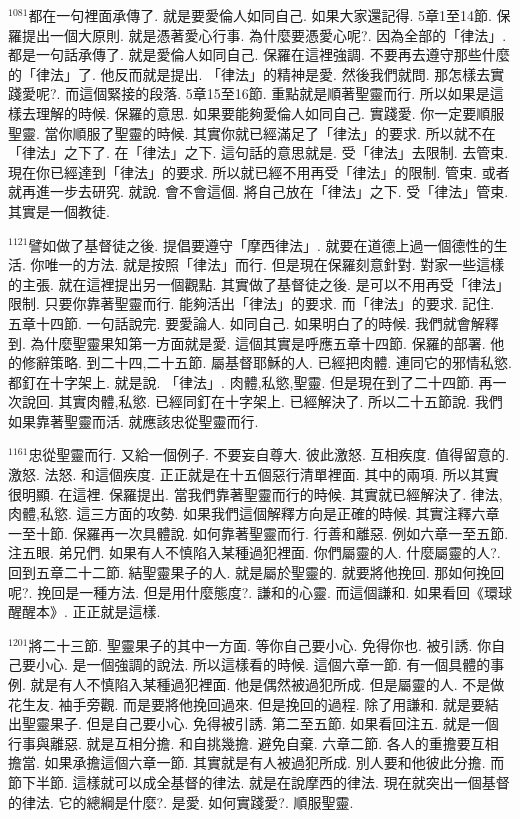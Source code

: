 \documentclass{book}
\begin{document}
$^{1081}$都在一句裡面承傳了.
就是要愛倫人如同自己.
如果大家還記得.
5章1至14節.
保羅提出一個大原則.
就是憑著愛心行事.
為什麼要憑愛心呢?.
因為全部的「律法」.
都是一句話承傳了.
就是愛倫人如同自己.
保羅在這裡強調.
不要再去遵守那些什麼的「律法」了.
他反而就是提出.
「律法」的精神是愛.
然後我們就問.
那怎樣去實踐愛呢?.
而這個緊接的段落.
5章15至16節.
重點就是順著聖靈而行.
所以如果是這樣去理解的時候.
保羅的意思.
如果要能夠愛倫人如同自己.
實踐愛.
你一定要順服聖靈.
當你順服了聖靈的時候.
其實你就已經滿足了「律法」的要求.
所以就不在「律法」之下了.
在「律法」之下.
這句話的意思就是.
受「律法」去限制.
去管束.
現在你已經達到「律法」的要求.
所以就已經不用再受「律法」的限制.
管束.
或者就再進一步去研究.
就說.
會不會這個.
將自己放在「律法」之下.
受「律法」管束.
其實是一個教徒.

$^{1121}$譬如做了基督徒之後.
提倡要遵守「摩西律法」.
就要在道德上過一個德性的生活.
你唯一的方法.
就是按照「律法」而行.
但是現在保羅刻意針對.
對家一些這樣的主張.
就在這裡提出另一個觀點.
其實做了基督徒之後.
是可以不用再受「律法」限制.
只要你靠著聖靈而行.
能夠活出「律法」的要求.
而「律法」的要求.
記住.
五章十四節.
一句話說完.
要愛論人.
如同自己.
如果明白了的時候.
我們就會解釋到.
為什麼聖靈果知第一方面就是愛.
這個其實是呼應五章十四節.
保羅的部署.
他的修辭策略.
到二十四,二十五節.
屬基督耶穌的人.
已經把肉體.
連同它的邪情私慾.
都釘在十字架上.
就是說.
「律法」.
肉體,私慾,聖靈.
但是現在到了二十四節.
再一次說回.
其實肉體,私慾.
已經同釘在十字架上.
已經解決了.
所以二十五節說.
我們如果靠著聖靈而活.
就應該忠從聖靈而行.

$^{1161}$忠從聖靈而行.
又給一個例子.
不要妄自尊大.
彼此激怒.
互相疾度.
值得留意的.
激怒.
法怒.
和這個疾度.
正正就是在十五個惡行清單裡面.
其中的兩項.
所以其實很明顯.
在這裡.
保羅提出.
當我們靠著聖靈而行的時候.
其實就已經解決了.
律法,肉體,私慾.
這三方面的攻勢.
如果我們這個解釋方向是正確的時候.
其實注釋六章一至十節.
保羅再一次具體說.
如何靠著聖靈而行.
行善和離惡.
例如六章一至五節.
注五眼.
弟兄們.
如果有人不慎陷入某種過犯裡面.
你們屬靈的人.
什麼屬靈的人?.
回到五章二十二節.
結聖靈果子的人.
就是屬於聖靈的.
就要將他挽回.
那如何挽回呢?.
挽回是一種方法.
但是用什麼態度?.
謙和的心靈.
而這個謙和.
如果看回《環球醒醒本》.
正正就是這樣.

$^{1201}$將二十三節.
聖靈果子的其中一方面.
等你自己要小心.
免得你也.
被引誘.
你自己要小心.
是一個強調的說法.
所以這樣看的時候.
這個六章一節.
有一個具體的事例.
就是有人不慎陷入某種過犯裡面.
他是偶然被過犯所成.
但是屬靈的人.
不是做花生友.
袖手旁觀.
而是要將他挽回過來.
但是挽回的過程.
除了用謙和.
就是要結出聖靈果子.
但是自己要小心.
免得被引誘.
第二至五節.
如果看回注五.
就是一個行事與離惡.
就是互相分擔.
和自挑幾擔.
避免自棄.
六章二節.
各人的重擔要互相擔當.
如果承擔這個六章一節.
其實就是有人被過犯所成.
別人要和他彼此分擔.
而節下半節.
這樣就可以成全基督的律法.
就是在說摩西的律法.
現在就突出一個基督的律法.
它的總綱是什麼?.
是愛.
如何實踐愛?.
順服聖靈.
\end{document}
